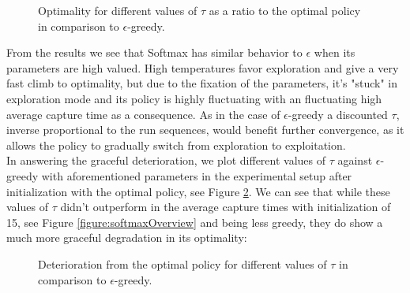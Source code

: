 \documentclass[paper=a4, fontsize=11pt]{scrartcl}
\numberwithin{equation}{section}		%
\numberwithin{figure}{section}			%
\numberwithin{table}{section}				%
\begin{document}
\begin{figure}[H] \centering
\caption{Optimality for different values of $\tau$ as a ratio to the optimal policy in comparison to $\epsilon$-greedy.} 
\label{figure:softmxOpti}
\end{figure}
From the results we see that Softmax has similar behavior to $\epsilon$ when its parameters are high valued. High temperatures favor exploration and give a very fast climb to optimality, but due to the fixation of the parameters, it's "stuck" in exploration mode and its policy is highly fluctuating with an fluctuating high average capture time as a consequence. As in the case of $\epsilon$-greedy a discounted $\tau$, inverse proportional to the run sequences, would benefit further convergence, as it allows the policy to gradually switch from exploration to exploitation. \\
In answering the graceful deterioration, we plot different values of $\tau$ against $\epsilon$-greedy with aforementioned parameters in the experimental setup after initialization with the optimal policy, see Figure \ref{figure:softmxGrace}. We can see that while these values of $\tau$ didn't outperform in the average capture times with initialization of 15, see Figure \ref{figure:softmaxOverview} and being less greedy, they do show a much more graceful degradation in its optimality:
\begin{figure}[H] \centering
\caption{Deterioration from the optimal policy for different values of $\tau$ in comparison to $\epsilon$-greedy.} 
\label{figure:softmxGrace}
\end{figure}
\end{document}
